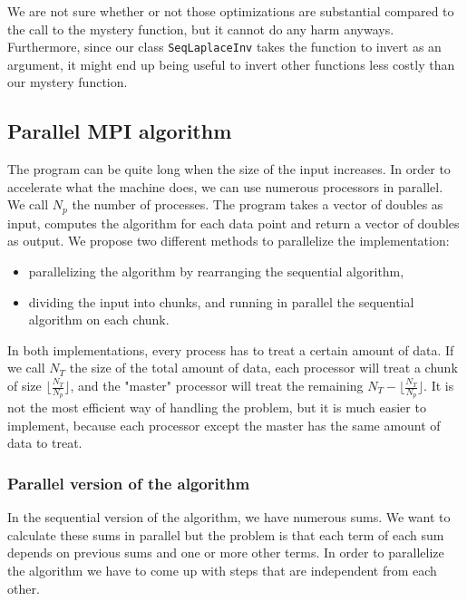 \documentclass[11pt,a4paper]{article}
\begin{document}
We are not sure whether or not those optimizations are substantial compared to the call to the mystery function, but it cannot do any harm anyways. Furthermore, since our class \verb_SeqLaplaceInv_ takes the function to invert as an argument, it might end up being useful to invert other functions less costly than our mystery function.

\subsection{Parallel MPI algorithm}

The program can be quite long when the size of the input increases. In order to accelerate what the machine does, we can use numerous processors in parallel. We call $N_p$ the number of processes. The program takes a vector of doubles as input, computes the algorithm for each data point and return a vector of doubles as output. We propose two different methods to parallelize the implementation:

\begin{itemize}

\item parallelizing the algorithm by rearranging the sequential algorithm,

\item dividing the input into chunks, and running in parallel the sequential algorithm on each chunk.

\end{itemize}

In both implementations, every process has to treat a certain amount of data. If we call $N_T$ the size of the total amount of data, each processor will treat a chunk of size $\lfloor \frac{N_T}{N_p} \rfloor$, and the "master" processor will treat the remaining $N_T-\lfloor \frac{N_T}{N_p} \rfloor$. It is not the most efficient way of handling the problem, but it is much easier to implement, because each processor except the master has the same amount of data to treat. 

\subsubsection{Parallel version of the algorithm}

In the sequential version of the algorithm, we have numerous sums. We want to calculate these sums in parallel but the problem is that each term of each sum depends on previous sums and one or more other terms. In order to parallelize the algorithm we have to come up with steps that are independent from each other.
\end{document}
